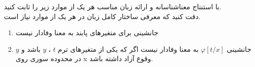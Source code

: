 
	با استنتاج معناشناسانه و ارائه زبان مناسب هر یک از موارد زیر را ثابت کنید.\\
	 دقت کنید که معرفی ساختار کامل زبان در هر یک از موارد نیاز است.
	\begin{enumerate}[label = \alph*)]
		\item 
		جانشینی برای متغیر‌های پابند به معنا وفادار نیست
		\item 
		جانشینی 
		$\varphi[t/x]$
		به معنا وفادار نیست اگر که یکی از متغیر‌های ترم
		$t$
		،
		$y$
		 باشد و
		 $y$ 
		  در محدوده سوری روی x وقوع آزاد داشته باشد.
	\end{enumerate}
